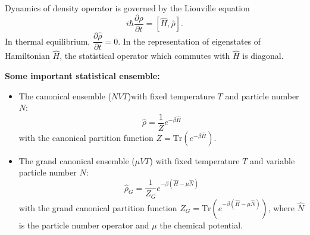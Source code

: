 \documentclass[a4paper,12pts,dvipsnames]{article}
\numberwithin{equation}{section}
\begin{document}
Dynamics of density operator is governed by the Liouville equation
\begin{equation}
i\hbar\frac{\partial\hat{\rho}}{\partial t} = [\hat{H},\hat{\rho}].
\end{equation}
In thermal equilibrium, $\dfrac{\partial\hat{\rho}}{\partial t} = 0$. In the representation of eigenstates of Hamiltonian $\hat{H}$, the statistical operator which commutes with $\hat{H}$ is diagonal.

\textbf{Some important statistical ensemble:}
\begin{itemize}
	\item The canonical ensemble  ($NVT$)with fixed temperature $T$ and particle number $N$:
	\begin{equation}
	\hat{\rho} = \frac{1}{Z}e^{-\beta\hat{H}}
	\end{equation}
	with the canonical partition function $Z=\text{Tr}\left(e^{-\beta\hat{H}}\right)$.
	\item The grand canonical ensemble ($\mu VT$) with fixed temperature $T$ and variable particle number $N$:
	\begin{equation}
	\hat{\rho}_G = \frac{1}{Z_G}e^{-\beta(\hat{H}-\mu\hat{N})}
	\end{equation}
	with the grand canonical partition function $Z_G = \text{Tr}\left(e^{-\beta(\hat{H}-\mu\hat{N})}\right)$, where $\hat{N}$ is the particle number operator and $\mu$ the chemical potential.
\end{itemize}
\end{document}
